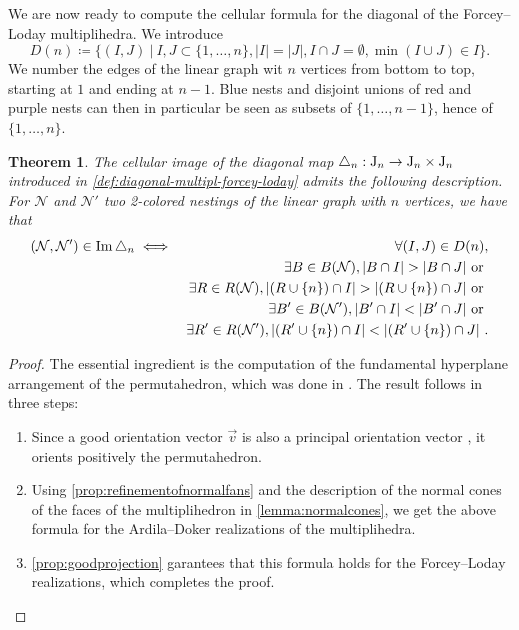 \documentclass[twoside, 11pt]{amsart}
\newtheorem{theorem}{Theorem}
\theoremstyle{remark}
\begin{document}
We are now ready to compute the cellular formula for the diagonal of the Forcey--Loday multiplihedra. We introduce \[ D(n)\coloneqq \{(I,J) \ | \ I,J\subset\{1,\ldots,n\}, |I|=|J|, I\cap J=\emptyset, \min(I\cup J)\in I \}. \]
We number the edges of the linear graph wit $n$ vertices from bottom to top, starting at $1$ and ending at $n-1$. 
Blue nests and disjoint unions of red and purple nests can then in particular be seen as subsets of $\{1,\ldots,n-1\}$, hence of $\{1,\ldots,n\}$.

\begin{theorem}
\label{thm:formuladiagonal}
The cellular image of the diagonal map $\triangle_n : \mathrm{J}_n \to \mathrm{J}_n \times \mathrm{J}_n$ introduced in \cref{def:diagonal-multipl-forcey-loday} admits the following description.
For $\mathcal{N}$ and $\mathcal{N}'$ two 2-colored nestings of the linear graph with $n$ vertices, we have that
\begin{eqnarray*}
  (\mathcal{N},\mathcal{N}') \in \Ima\triangle_n 
  & \iff & \forall (I,J) \in D(n), \\
  && \exists B \in B(\mathcal{N}), |B\cap I|>|B\cap J| \text{ or }  \\
  && \exists R \in R(\mathcal{N}), |(R\cup \{n\}) \cap I|>| (R\cup \{n\}) \cap J| \text{ or }  \\
  && \exists B' \in B(\mathcal{N}'), |B'\cap I|<|B'\cap J| \text{ or } \nonumber \\
  && \exists R' \in R(\mathcal{N}'), |(R'\cup \{n\}) \cap I|<| (R'\cup \{n\}) \cap J| \ .
\end{eqnarray*}
\end{theorem}

\begin{proof} 
The essential ingredient is the computation of the fundamental hyperplane arrangement of the permutahedron, which was done in \cite[Section 3.1]{LA21}. The result follows in three steps:
\begin{enumerate}[leftmargin=*]
\item Since a good orientation vector $\vec v$ is also a principal orientation vector \cite[Definition 3.15]{LA21}, it orients positively the permutahedron. 
\item Using \cref{prop:refinementofnormalfans} and the description of the normal cones of the faces of the multiplihedron in \cref{lemma:normalcones}, we get the above formula for the Ardila--Doker realizations of the multiplihedra. 
\item \cref{prop:goodprojection} garantees that this formula holds for the Forcey--Loday realizations, which completes the proof.
\end{enumerate}
\end{proof}
\end{document}
